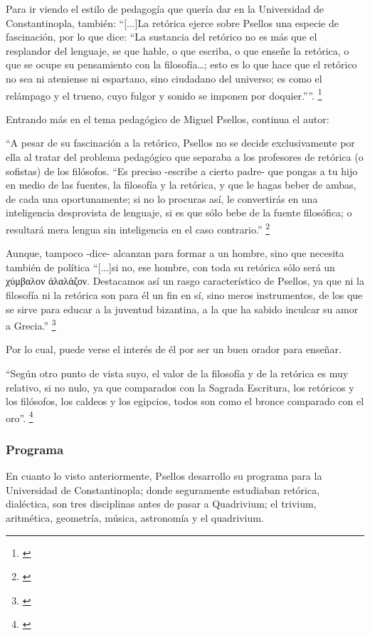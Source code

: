 Para ir viendo el estilo de pedagogía que quería dar en la 
Universidad de Constantinopla, también: “[...]La retórica ejerce 
sobre Psellos una especie de fascinación, por lo que dice: 
“La sustancia del retórico no es más que el resplandor del lenguaje, 
se que hable, o que escriba, o que enseñe la retórica, 
o que se ocupe su pensamiento con la filosofía…; esto es lo que 
hace que el retórico no sea ni ateniense ni espartano, sino ciudadano 
del universo; es como el relámpago y el trueno, cuyo fulgor y sonido 
se imponen por doquier.””.
\footnote{\cite[p.~161]{filosofia}}

Entrando más en el tema pedagógico de Miguel Psellos, continua el autor:

“A pesar de su fascinación a la retórico, Psellos no se decide 
exclusivamente por ella al tratar del problema pedagógico que separaba 
a los profesores de retórica (o sofistas) de los filósofos. 
“Es preciso -escribe a cierto padre- que pongas a tu hijo en medio de 
las fuentes, la filosofía y la retórica, y que le hagas beber de ambas, 
de cada una oportunamente; si no lo procuras así, le convertirás en 
una inteligencia desprovista de lenguaje, si es que sólo bebe de la 
fuente filosófica; o resultará mera lengua sin inteligencia en el 
caso contrario.”
\footnote{\cite[p.~161]{filosofia}}

Aunque, tampoco -dice- alcanzan para formar a un hombre, sino que 
necesita también de política “[...]si no, ese hombre, con toda su 
retórica sólo será un 
	χύμβαλον άλαλάζον.
 Destacamos así un rasgo característico de Psellos, ya que ni la 
 filosofía ni la retórica son para él un fin en sí, sino meros 
 instrumentos, de los que se sirve para educar a la juventud bizantina, 
 a la que ha sabido inculcar su amor a Grecia.”
 \footnote{\cite[p.~161]{filosofia}}

Por lo cual, puede verse el interés de él por ser un buen 
orador para enseñar.

“Según otro punto de vista suyo, el valor de la filosofía y de la 
retórica es muy relativo, si no nulo, ya que comparados con la 
Sagrada Escritura, los retóricos y los filósofos, 
los caldeos y los egipcios, todos son como el 
bronce comparado con el oro”.
\footnote{\cite[p.~161]{filosofia}}

\subsubsection{Programa}
En cuanto lo visto anteriormente, Psellos desarrollo su 
programa para la Universidad de Constantinopla; donde seguramente
estudiaban retórica, dialéctica, son tres disciplinas antes
de pasar a Quadrivium;
el trivium, aritmética, geometría, 
música, astronomía y el quadrivium.

